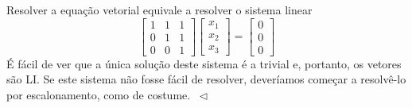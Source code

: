 \documentclass[../livro.tex]{subfiles}
\begin{document}
\begin{example}
Resolver a equação vetorial equivale a resolver o sistema linear
\begin{equation}
\left[
  \begin{array}{ccc}
    1 & 1 & 1 \\
    0 & 1 & 1 \\
    0 & 0 & 1 
  \end{array}
\right]
\left[
  \begin{array}{c}
    x_1 \\
    x_2 \\
    x_3 
  \end{array}
\right] =
\left[
  \begin{array}{c}
    0 \\
    0 \\
    0 
  \end{array}
\right]
\end{equation} É fácil de ver que a única solução deste sistema é a trivial e, portanto, os vetores são LI. Se este sistema não fosse fácil de resolver, deveríamos começar a resolvê-lo por escalonamento, como de costume. $\ \lhd$
\end{example}
\end{document}
